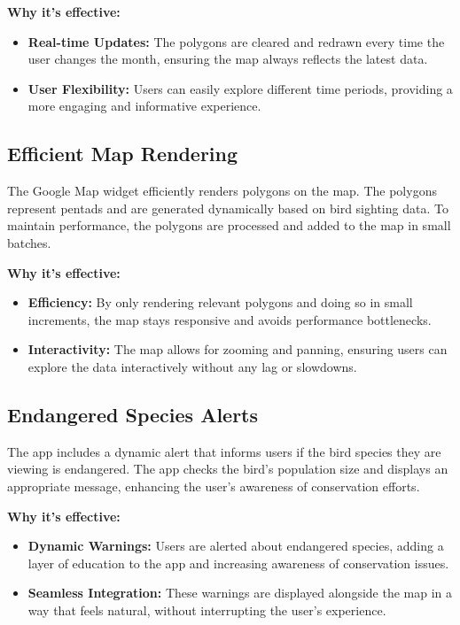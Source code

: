 \documentclass[a4paper]{article}
\begin{document}
\textbf{Why it's effective:}
\begin{itemize}
    \item \textbf{Real-time Updates:} The polygons are cleared and redrawn every time the user changes the month, ensuring the map always reflects the latest data.
    \item \textbf{User Flexibility:} Users can easily explore different time periods, providing a more engaging and informative experience.
\end{itemize}

\subsection{Efficient Map Rendering}
The Google Map widget efficiently renders polygons on the map. The polygons represent pentads and are generated dynamically based on bird sighting data. To maintain performance, the polygons are processed and added to the map in small batches.

\textbf{Why it's effective:}
\begin{itemize}
    \item \textbf{Efficiency:} By only rendering relevant polygons and doing so in small increments, the map stays responsive and avoids performance bottlenecks.
    \item \textbf{Interactivity:} The map allows for zooming and panning, ensuring users can explore the data interactively without any lag or slowdowns.
\end{itemize}

\subsection{Endangered Species Alerts}
The app includes a dynamic alert that informs users if the bird species they are viewing is endangered. The app checks the bird's population size and displays an appropriate message, enhancing the user's awareness of conservation efforts.

\textbf{Why it's effective:}
\begin{itemize}
    \item \textbf{Dynamic Warnings:} Users are alerted about endangered species, adding a layer of education to the app and increasing awareness of conservation issues.
    \item \textbf{Seamless Integration:} These warnings are displayed alongside the map in a way that feels natural, without interrupting the user's experience.
\end{itemize}
\end{document}
